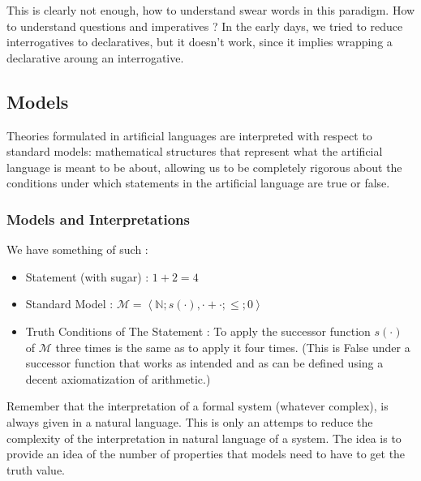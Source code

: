 \documentclass{cours}
\begin{document}
This is clearly not enough, how to understand swear words in this paradigm. How to understand questions and imperatives ? In the early days, we tried to reduce interrogatives to declaratives, but it doesn't work, since it implies wrapping a declarative aroung an interrogative. 

\subsection{Models}
Theories formulated in artificial languages are interpreted with respect to standard models\!: mathematical structures that represent what the artificial language is meant to be about, allowing us to be completely rigorous about the conditions under which statements in the artificial language are true or false.
\subsubsection{Models and Interpretations}
We have something of such\! : 
\begin{itemize}
    \item Statement (with sugar)\! : $1 + 2 = 4$
    \item Standard Model\! : $\mathcal{M} = \left\langle\mathbb{N}; s(\cdot), \cdot + \cdot;\leq;0\right\rangle$
    \item Truth Conditions of The Statement\! : To apply the successor function $s(\cdot)$ of $\mathcal{M}$ three times is the same as to apply it four times. (This is \textmd{False} under a successor function that works as intended and as can be defined using a decent axiomatization of arithmetic.)
\end{itemize}
Remember that the interpretation of a formal system (whatever complex), is always given in a natural language. This is only an attemps to reduce the complexity of the interpretation in natural language of a system. The idea is to provide an idea of the number of properties that models need to have to get the truth value.
\end{document}
